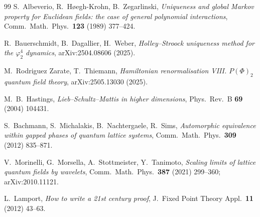 \documentclass[11pt,a4paper]{article}
\theoremstyle{plain}
\theoremstyle{definition}
\theoremstyle{plain}
\theoremstyle{definition}
\begin{document}
\begin{thebibliography}{99}
 S.~Albeverio, R.~H\o egh-Krohn, B.~Zegarlinski,
\emph{Uniqueness and global Markov property for Euclidean fields: the case of general
polynomial interactions},
Comm.\ Math.\ Phys.\ \textbf{123} (1989) 377--424.

 R.~Bauerschmidt, B.~Dagallier, H.~Weber,
\emph{Holley--Stroock uniqueness method for the $\varphi^4_2$ dynamics},
arXiv:2504.08606 (2025).

 M.~Rodriguez Zarate, T.~Thiemann,
\emph{Hamiltonian renormalisation VIII. $P(\Phi)_2$ quantum field theory},
arXiv:2505.13030 (2025).

 M.~B.~Hastings,
\emph{Lieb--Schultz--Mattis in higher dimensions},
Phys.\ Rev.\ B \textbf{69} (2004) 104431.

 S.~Bachmann, S.~Michalakis, B.~Nachtergaele, R.~Sims,
\emph{Automorphic equivalence within gapped phases of quantum lattice systems},
Comm.\ Math.\ Phys.\ \textbf{309} (2012) 835--871.

 V.~Morinelli, G.~Morsella, A.~Stottmeister, Y.~Tanimoto,
\emph{Scaling limits of lattice quantum fields by wavelets},
Comm.\ Math.\ Phys.\ \textbf{387} (2021) 299--360; arXiv:2010.11121.

 L.~Lamport,
\emph{How to write a 21st century proof},
J.\ Fixed Point Theory Appl.\ \textbf{11} (2012) 43--63.

\end{thebibliography}
\end{document}

